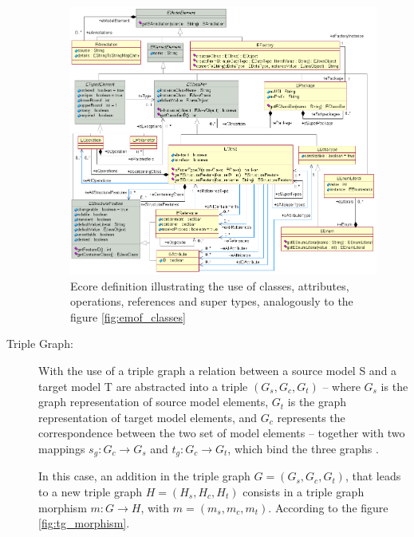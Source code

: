 \documentclass[tuberlin,cic,tc,english,noabntcite]{iiufrgs}
\begin{document}
\begin{description}
	\begin{figure}[h]
	    \caption{Ecore definition illustrating the use of classes, attributes, operations, references and super types, analogously to the figure \ref{fig:emof_classes}}
	    \begin{center}
	        \includegraphics[width=35em]{ecore_relations}   
	    \end{center}
	    \label{fig:ecore_relations}
	\end{figure}

	\item[Triple Graph:] With the use of a triple graph a relation between a source model S and a target model T are abstracted into a triple $(G_s,G_c,G_t)$ – where $G_s$ is the graph representation of source model elements, $G_t$ is the graph representation of target model elements, and $G_c$ represents the correspondence between the two set of model elements – together with two mappings $s_g: G_c \rightarrow G_s$ and $t_g: G_c \rightarrow G_t$, which bind the three graphs \citep{hermann2011correctness}.
	
	In this case, an addition in the triple graph $G = (G_s,G_c,G_t)$, that leads to a new triple graph $H = (H_s,H_c,H_t)$ consists in a triple graph morphism $m: G \rightarrow H$, with $m = (m_s,m_c,m_t)$. According to the figure \ref{fig:tg_morphism}.


\end{description}
\end{document}
